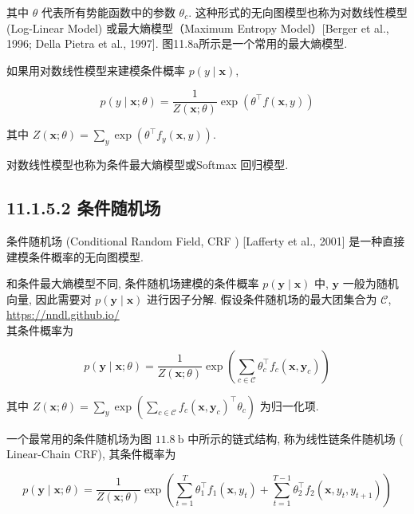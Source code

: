 \documentclass[10pt]{article}
\begin{document}
其中 $\theta$ 代表所有势能函数中的参数 $\theta_{c}$. 这种形式的无向图模型也称为对数线性模型 (Log-Linear Model) 或最大熵模型（Maximum Entropy Model）[Berger et al., 1996; Della Pietra et al., 1997]. 图11.8a所示是一个常用的最大熵模型.

如果用对数线性模型来建模条件概率 $p(y \mid \boldsymbol{x})$,


\begin{equation*}
p(y \mid \boldsymbol{x} ; \theta)=\frac{1}{Z(\boldsymbol{x} ; \theta)} \exp \left(\theta^{\top} f(\boldsymbol{x}, y)\right) \tag{11.23}
\end{equation*}


其中 $Z(\boldsymbol{x} ; \theta)=\sum_{y} \exp \left(\theta^{\top} f_{y}(\boldsymbol{x}, y)\right)$.

对数线性模型也称为条件最大熵模型或Softmax 回归模型.

\subsection*{11.1.5.2 条件随机场}
条件随机场 (Conditional Random Field, CRF ) [Lafferty et al., 2001] 是一种直接建模条件概率的无向图模型.

和条件最大熵模型不同, 条件随机场建模的条件概率 $p(\boldsymbol{y} \mid \boldsymbol{x})$ 中, $\boldsymbol{y}$ 一般为随机向量, 因此需要对 $p(\boldsymbol{y} \mid \boldsymbol{x})$ 进行因子分解. 假设条件随机场的最大团集合为 $\mathcal{C}$, \href{https://nndl.github.io/}{https://nndl.github.io/}\\
其条件概率为


\begin{equation*}
p(\boldsymbol{y} \mid \boldsymbol{x} ; \theta)=\frac{1}{Z(\boldsymbol{x} ; \theta)} \exp \left(\sum_{c \in \mathcal{C}} \theta_{c}^{\top} f_{c}\left(\boldsymbol{x}, \boldsymbol{y}_{c}\right)\right) \tag{11.24}
\end{equation*}


其中 $Z(\boldsymbol{x} ; \theta)=\sum_{y} \exp \left(\sum_{c \in \mathcal{C}} f_{c}\left(\boldsymbol{x}, \boldsymbol{y}_{c}\right)^{\top} \theta_{c}\right)$ 为归一化项.

一个最常用的条件随机场为图 $11.8 \mathrm{~b}$ 中所示的链式结构, 称为线性链条件随机场 ( Linear-Chain CRF), 其条件概率为


\begin{equation*}
p(\boldsymbol{y} \mid \boldsymbol{x} ; \theta)=\frac{1}{Z(\boldsymbol{x} ; \theta)} \exp \left(\sum_{t=1}^{T} \theta_{1}^{\top} f_{1}\left(\boldsymbol{x}, y_{t}\right)+\sum_{t=1}^{T-1} \theta_{2}^{\top} f_{2}\left(\boldsymbol{x}, y_{t}, y_{t+1}\right)\right) \tag{11.25}
\end{equation*}
\end{document}
